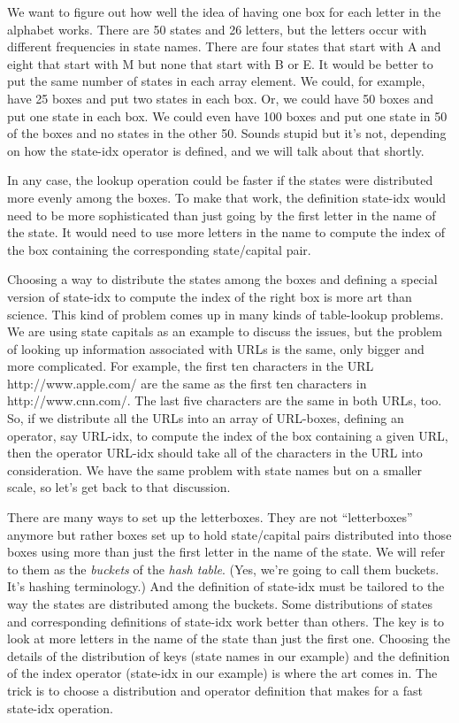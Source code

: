 We want to figure out
how well the idea of having one box for each letter
in the alphabet works.
There are 50 states and 26 letters, but the letters occur
with different frequencies in state names.
There are four states that start with A and
eight that start with M
but none that start with B or E.
It would be better to put the same number of states in each
array element. We could, for example, have 25 boxes and put
two states in each box. Or, we could have 50 boxes and put
one state in each box.
We could even have 100 boxes and put one state in 50
of the boxes and no states in the other 50.
Sounds stupid but it's not, depending on how
the \textsf{state-idx} operator is defined,
and we will talk about that shortly.

In any case, the \textsf{lookup} operation could be faster
if the states were distributed more evenly among the boxes.
To make that work, the definition
\textsf{state-idx} would need to be more sophisticated
than just going by the first letter in the name of the state.
It would need to use more letters in the name
to compute the index of the box containing the corresponding
state/capital pair.

Choosing a way to distribute the states among the boxes
and defining a special version of \textsf{state-idx}
to compute the index of the right box is
more art than science. This kind of problem comes up in
many kinds of table-lookup problems. We are using
state capitals as an example to discuss the issues,
but the problem of looking up information associated
with URLs is the same, only bigger and more complicated.
For example, the first ten characters in the URL
http://www.apple.com/ are the same as the first ten
characters in http://www.cnn.com/. The last five
characters are the same in both URLs, too.
So, if we distribute all the URLs into an array of URL-boxes,
defining an operator, say \textsf{URL-idx}, to compute the
index of the box containing a given URL,
then the operator \textsf{URL-idx} should take
all of the characters in the URL into consideration.
We have the same problem with state names but on a
smaller scale, so let's get back to that discussion.

There are many ways to set up the letterboxes.
They are not ``letterboxes'' anymore but rather boxes set up to hold
state/capital pairs distributed into those boxes using
more than just the first letter in the name of the state.
We will refer to them as the
\emph{buckets}
of the \emph{hash table}.
(Yes, we're going to call them buckets. It's hashing terminology.)
And the definition of \textsf{state-idx} must be
tailored to the way the states are distributed among the buckets.
Some distributions of states and corresponding definitions
of \textsf{state-idx} work better than others.
The key is to look at more letters in the name of the state
than just the first one.
Choosing the details of the distribution of keys
(state names in our example) and the definition of the index operator
(\textsf{state-idx} in our example) is where the art comes in.
The trick is to choose a distribution and operator
definition that makes for a fast \textsf{state-idx} operation.

